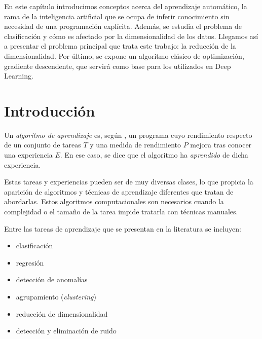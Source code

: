
En este capítulo introducimos conceptos acerca del aprendizaje automático, la rama de la inteligencia artificial que se ocupa de inferir conocimiento sin necesidad de una programación explícita. Además, se estudia el problema de clasificación y cómo es afectado por la dimensionalidad de los datos. Llegamos así a presentar el problema principal que trata este trabajo: la reducción de la dimensionalidad. Por último, se expone un algoritmo clásico de optimización, gradiente descendente, que servirá como base para los utilizados en Deep Learning.

\section{Introducción}\label{introducciuxf3n}




Un \emph{algoritmo de aprendizaje} es, según \textcite{mitchell1997}, un
programa cuyo rendimiento respecto de un conjunto de tareas \(T\) y una
medida de rendimiento \(P\) mejora tras conocer una experiencia \(E\).
En ese caso, se dice que el algoritmo ha \emph{aprendido} de dicha
experiencia.

Estas tareas y experiencias pueden ser de muy diversas clases, lo que
propicia la aparición de algoritmos y técnicas de aprendizaje diferentes
que tratan de abordarlas. Estos algoritmos computacionales son
necesarios cuando la complejidad o el tamaño de la tarea impide tratarla
con técnicas manuales.

Entre las tareas de aprendizaje que se presentan en la literatura se
incluyen:

\begin{itemize}
\tightlist
\item
  clasificación
\item
  regresión
\item
  detección de anomalías
\item
  agrupamiento (\emph{clustering})
\item
  reducción de dimensionalidad
\item
  detección y eliminación de ruido
\end{itemize}


